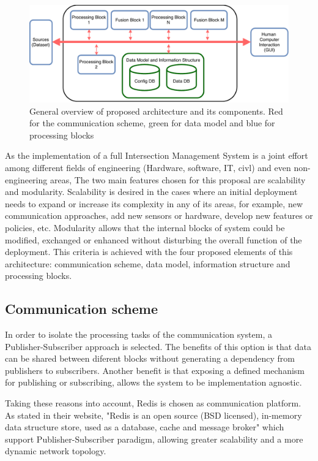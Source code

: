 \begin{figure}[ht!]
\centering
\includegraphics[scale=0.7]{fig/3/proposal_blocks.pdf}
\caption{General overview of proposed architecture and its components. Red for the communication scheme, green for data model and blue for processing blocks}
\label{proposal_blocks}
\end{figure} 


As the implementation of a full Intersection Management System is a joint effort among different fields of engineering (Hardware, software, IT, civl) and even non-engineering areas, The two main features chosen for this proposal are scalability and modularity. Scalability is desired in the cases where an initial deployment needs to expand or increase its complexity in any of its areas, for example, new communication approaches, add new sensors or hardware, develop new features or policies, etc. Modularity allows that the internal blocks of system could be modified, exchanged or enhanced without disturbing the overall function of the deployment. This criteria is achieved with the four proposed elements of this architecture: communication scheme, data model, information structure and processing blocks. 


\subsection{Communication scheme}

In order to isolate the processing tasks of the communication system, a Publisher-Subscriber approach is selected. The benefits of this option is that data can be shared between diferent blocks without generating a dependency from publishers to subscribers. Another benefit is that exposing a defined mechanism for publishing or subscribing, allows the system to be implementation agnostic.

Taking these reasons into account, Redis is chosen as communication platform. As stated in their website, "Redis is an open source (BSD licensed), in-memory data structure store, used as a database, cache and message broker"\cite{Redis} which support Publisher-Subscriber paradigm, allowing greater scalability and a more dynamic network topology.

